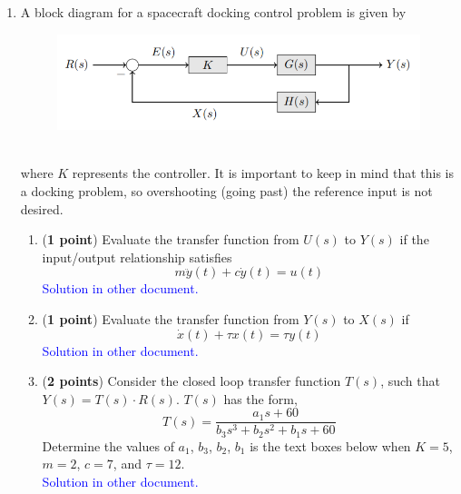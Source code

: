 \documentclass[]{article}
\begin{document}
\begin{enumerate}

    \item A block diagram for a spacecraft docking control problem is given by
    \begin{figure}[h]
        \includegraphics[scale=0.8,center]{AERO_422_HW3_P1.png}
    \end{figure}
    \\where $K$ represents the controller. It is important to keep in mind that this is a docking problem, so overshooting (going past) the reference input is not desired.

    \begin{enumerate}
        \item (\textbf{1 point}) Evaluate the transfer function from $U(s)$ to $Y(s)$ if the input/output relationship satisfies
        $$m\ddot{y}(t) + c\dot{y}(t) = u(t)$$
        \textcolor{blue}{
        Solution in other document.
        }

        \item (\textbf{1 point}) Evaluate the transfer function from $Y(s)$ to $X(s)$ if
        $$\dot{x}(t) + \tau x(t) = \tau y(t)$$
        \textcolor{blue}{
        Solution in other document.
        }

        \item (\textbf{2 points}) Consider the closed loop transfer function $T(s)$, such that $Y(s) = T(s) \cdot R(s)$. $T(s)$ has the form, 
        $$T(s) = \frac{a_1s + 60}{b_3s^3 + b_2s^2 + b_1s + 60}$$        
        Determine the values of $a_1$, $b_3$, $b_2$, $b_1$ is the text boxes below when
        $K = 5$, $m = 2$, $c = 7$, and $\tau = 12$.\\
        \textcolor{blue}{
        Solution in other document.
        }


\end{enumerate}
\end{enumerate}
\end{document}
